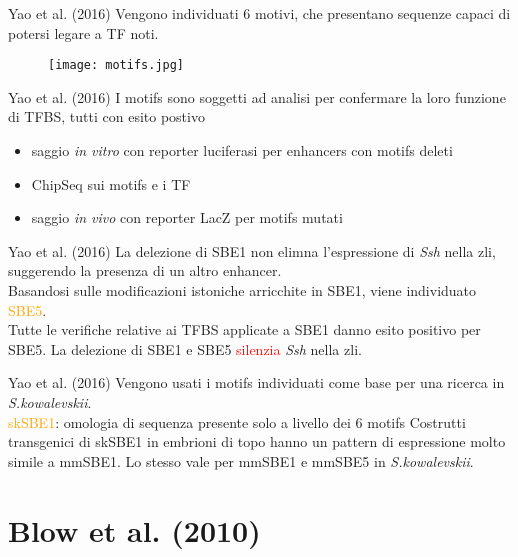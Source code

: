 \documentclass{beamer}
\newcommand{\warn}[1]{\textcolor{red}{#1}}
\begin{document}
    \begin{frame}[plain]{Yao et al. (2016)}
        Vengono individuati 6 motivi, che presentano sequenze capaci di potersi legare a TF noti.\\
        \begin{figure}
            \texttt{[image: motifs.jpg]}
        \end{figure}
    \end{frame}


    \begin{frame}[plain]{Yao et al. (2016)}
        I motifs sono soggetti ad analisi per confermare la loro funzione di TFBS,
        tutti con esito postivo
        \begin{itemize}
            \item saggio \emph{in vitro} con reporter luciferasi per enhancers con motifs deleti
            \item ChipSeq sui motifs e i TF
            \item saggio \emph{in vivo} con reporter LacZ per motifs mutati
        \end{itemize}
    \end{frame}


    \begin{frame}[plain]{Yao et al. (2016)}
        La delezione di SBE1 non elimna l'espressione di \emph{Ssh} nella zli,
        suggerendo la presenza di un altro enhancer.\\
        Basandosi sulle modificazioni istoniche arricchite in SBE1, viene individuato \textcolor{orange}{SBE5}.\\
        Tutte le verifiche relative ai TFBS applicate a SBE1 danno esito positivo per SBE5.
        La delezione di SBE1 e SBE5 \warn{silenzia} \emph{Ssh} nella zli.
    \end{frame}


    \begin{frame}[plain]{Yao et al. (2016)}
        Vengono usati i motifs individuati come base per una ricerca in \emph{S.kowalevskii}.\\
        \textcolor{orange}{skSBE1}: omologia di sequenza presente solo a livello dei 6 motifs
        Costrutti transgenici di skSBE1 in embrioni di topo hanno un pattern di espressione
        molto simile a mmSBE1. Lo stesso vale per mmSBE1 e mmSBE5 in \emph{S.kowalevskii}.
    \end{frame}

    \section{Blow et al. (2010)}
\end{document}
